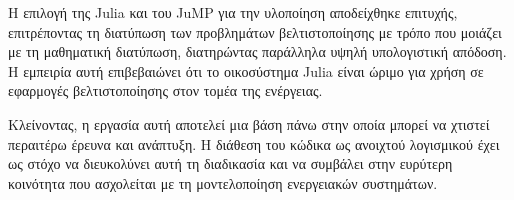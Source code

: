 Η επιλογή της Julia και του JuMP για την υλοποίηση αποδείχθηκε επιτυχής, επιτρέποντας τη διατύπωση των προβλημάτων βελτιστοποίησης με τρόπο που μοιάζει με τη μαθηματική διατύπωση, διατηρώντας παράλληλα υψηλή υπολογιστική απόδοση. Η εμπειρία αυτή επιβεβαιώνει ότι το οικοσύστημα Julia είναι ώριμο για χρήση σε εφαρμογές βελτιστοποίησης στον τομέα της ενέργειας.

Κλείνοντας, η εργασία αυτή αποτελεί μια βάση πάνω στην οποία μπορεί να χτιστεί περαιτέρω έρευνα και ανάπτυξη. Η διάθεση του κώδικα ως ανοιχτού λογισμικού έχει ως στόχο να διευκολύνει αυτή τη διαδικασία και να συμβάλει στην ευρύτερη κοινότητα που ασχολείται με τη μοντελοποίηση ενεργειακών συστημάτων.
